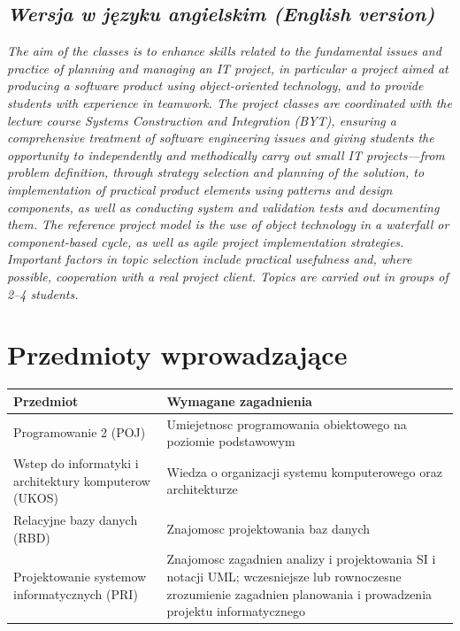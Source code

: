 \documentclass[12pt, a4paper]{article}
\newcommand{\thdrule}{\noalign{\global\setlength{\extrarowheight}{0pt}}}
\newcommand{\thdend}{\noalign{\global\setlength{\extrarowheight}{3pt}}}
\begin{document}
\subsection*{\textit{Wersja w języku angielskim (English version)}}

\textit{The aim of the classes is to enhance skills related to the fundamental issues and practice of planning and managing an IT project, in particular a project aimed at producing a software product using object-oriented technology, and to provide students with experience in teamwork. The project classes are coordinated with the lecture course Systems Construction and Integration (BYT), ensuring a comprehensive treatment of software engineering issues and giving students the opportunity to independently and methodically carry out small IT projects—from problem definition, through strategy selection and planning of the solution, to implementation of practical product elements using patterns and design components, as well as conducting system and validation tests and documenting them. The reference project model is the use of object technology in a waterfall or component-based cycle, as well as agile project implementation strategies. Important factors in topic selection include practical usefulness and, where possible, cooperation with a real project client. Topics are carried out in groups of 2–4 students.}


\section{Przedmioty wprowadzające}

{\scriptsize
\begin{tabularx}{\textwidth}{m{5cm}Y}
\thdrule\toprule
{} {\color{white}\textbf{Przedmiot}} & {\color{white}\textbf{Wymagane zagadnienia}} \\
\midrule\thdend
   Programowanie 2 (POJ) & Umiejetnosc programowania obiektowego na poziomie podstawowym \\
   Wstep do informatyki i architektury komputerow (UKOS) & Wiedza o organizacji systemu komputerowego oraz architekturze \\
   Relacyjne bazy danych (RBD) & Znajomosc projektowania baz danych \\
   Projektowanie systemow informatycznych (PRI) & Znajomosc zagadnien analizy i projektowania SI i notacji UML; wczesniejsze lub rownoczesne zrozumienie zagadnien planowania i prowadzenia projektu informatycznego \\
\bottomrule
\end{tabularx}}
\end{document}
